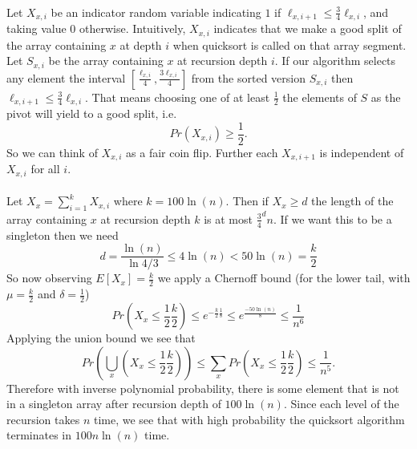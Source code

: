 \documentclass[letterpaper,12pt,oneside,onecolumn]{article}
\begin{document}
\paragraph{}
Let $X_{x,i}$ be an indicator random variable indicating $1$ if $\ell_{x,i+1} \leq \frac{3}{4}\ell_{x,i}$, and taking value $0$ otherwise. Intuitively, $X_{x,i}$ indicates that we make a good split of the array containing $x$ at depth $i$ when quicksort is called on that array segment. Let $S_{x,i}$ be the array containing $x$ at recursion depth $i$. If our algorithm selects any element the interval $[\frac{\ell_{x,i}}{4}, \frac{3\ell_{x,i}}{4}]$ from the sorted version $S_{x,i}$ then $\ell_{x,i+1} \leq \frac{3}{4}\ell_{x,i}$. That means choosing one of at least $\frac{1}{2}$ the elements of $S$ as the pivot will yield to a good split, i.e.
$$Pr(X_{x,i}) \geq \frac{1}{2}.$$
So we can think of $X_{x,i}$ as a fair coin flip. Further each $X_{x,i+1}$ is independent of $X_{x,i}$ for all $i$.
\paragraph{}
Let $X_{x} = \sum_{i=1}^{k} X_{x,i}$ where $k=100\ln(n)$. Then if $X_{x} \geq d$ the length of the array containing $x$ at recursion depth $k$ is at most $\frac{3}{4}^d n$. If we want this to be a singleton then we need $$d = \frac{\ln(n)}{\ln{4/3}} \leq 4\ln(n) < 50\ln(n) = \frac{k}{2}$$
So now observing $E[X_{x}] =\frac{k}{2}$ we apply a Chernoff bound (for the lower tail, with $\mu = \frac{k}{2}$ and $\delta = \frac{1}{2}$)
$$Pr(X_{x} \leq \frac{1}{2}\frac{k}{2}) \leq e^{-\frac{k}{2}\frac{1}{8}} \leq e^{\frac{-50\ln(n)}{8}} \leq \frac{1}{n^6}$$
Applying the union bound we see that
$$Pr(\bigcup_x(X_{x} \leq \frac{1}{2}\frac{k}{2})) \leq \sum_{x} Pr(X_{x} \leq \frac{1}{2}\frac{k}{2})  \leq \frac{1}{n^5}.$$
Therefore with inverse polynomial probability, there is some element that is not in a singleton array after recursion depth of $100 \ln(n)$. Since each level of the recursion takes $n$ time, we see that with high probability the quicksort algorithm terminates in $100n\ln(n)$ time.
\end{document}
